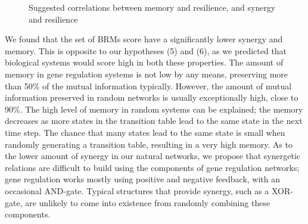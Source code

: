 \documentclass[../main.tex]{subfiles}
\begin{document}
\def\firstcircle{(0:-0.9cm) circle (2cm)}
\def\thirdcircle{(0:0.9cm) circle (2cm)}
\begin{figure}[ht]
\begin{center}
\end{center}
\caption{Suggested correlations between memory and resilience, and synergy and resilience}
\label{venn_results}
\end{figure}

We found that the set of BRMs score have a significantly lower synergy and memory.
This is opposite to our hypotheses (5) and (6), as we predicted that biological systems would score high in both these properties.
The amount of memory in gene regulation systems is not low by any means, preserving more than 50\% of the mutual information typically.
However, the amount of mutual information preserved in random networks is usually exceptionally high, close to 90\%.
The high level of memory in random systems can be explained; the memory decreases as more states in the transition table lead to the same state in the next time step.
The chance that many states lead to the same state is small when randomly generating a transition table, resulting in a very high memory.
As to the lower amount of synergy in our natural networks, we propose that synergetic relations are difficult to build using the components of gene regulation networks; gene regulation works mostly using positive and negative feedback, with an occasional AND-gate.
Typical structures that provide synergy, such as a XOR-gate, are unlikely to come into existence from randomly combining these components.
\end{document}
